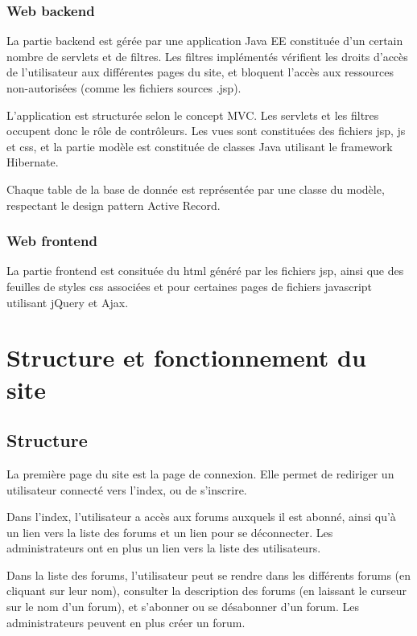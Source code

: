 \documentclass[10pt,a4paper]{article}
\begin{document}
	\subsubsection{Web backend}
	
	La partie backend est gérée par une application Java EE constituée d'un certain nombre de servlets et de filtres. Les filtres implémentés vérifient les droits d'accès de l'utilisateur aux différentes pages du site, et bloquent l'accès aux ressources non-autorisées (comme les fichiers sources .jsp).
	
	L'application est structurée selon le concept MVC. Les servlets et les filtres occupent donc le rôle de contrôleurs. Les vues sont constituées des fichiers jsp, js et css, et la partie modèle est constituée de classes Java utilisant le framework Hibernate.
	
	Chaque table de la base de donnée est représentée par une classe du modèle, respectant le design pattern Active Record.
	
	\subsubsection{Web frontend}
	
	La partie frontend est consituée du html généré par les fichiers jsp, ainsi que des feuilles de styles css associées et pour certaines pages de fichiers javascript utilisant jQuery et Ajax. 
	

	\section{Structure et fonctionnement du site}
	
	\subsection{Structure}
	
	La première page du site est la page de connexion. Elle permet de rediriger un utilisateur connecté vers l'index, ou de s'inscrire.
	
	Dans l'index, l'utilisateur a accès aux forums  auxquels il est abonné, ainsi qu'à un lien vers la liste des forums et un lien pour se déconnecter. Les administrateurs ont en plus un lien vers la liste des utilisateurs.
	
	Dans la liste des forums, l'utilisateur peut se rendre dans les différents forums (en cliquant sur leur nom), consulter la description des forums (en laissant le curseur sur le nom d'un forum), et s'abonner ou se désabonner d'un forum. Les administrateurs peuvent en plus créer un forum.
	
\end{document}
